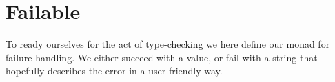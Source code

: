 \section{Failable}




To ready ourselves for the act of type-checking we here define our monad for
failure handling. We either succeed with a value, or fail with a string that
hopefully describes the error in a user friendly way.

